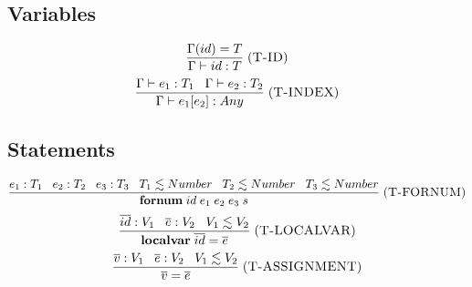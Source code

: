 \documentclass[12pt]{article}
\newcommand{\mylabel}[1]{\; (\textsc{#1})}
\newcommand{\env}{\Gamma}
\begin{document}
\subsection{Variables}

\[
\frac{\env(id) = T}
     {\env \vdash id : T}
\mylabel{T-ID}
\]
\[
\frac{\env \vdash e_{1}:T_{1} \;\;\; \env \vdash e_{2}:T_{2}}
     {\env \vdash e_{1}[e_{2}] : Any}
\mylabel{T-INDEX}
\]

\subsection{Statements}

\[
\frac{e_{1}:T_{1} \;\;\; e_{2}:T_{2} \;\;\; e_{3}:T_{3} \;\;\;
      T_{1} \lesssim Number \;\;\; T_{2} \lesssim Number \;\;\;
      T_{3} \lesssim Number}
     {\textbf{fornum} \; id \; e_{1} \; e_{2} \; e_{3} \; s}
\mylabel{T-FORNUM}
\]
\[
\frac{\overline{id}:V_{1} \;\;\; \overline{e}:V_2 \;\;\; V_{1} \lesssim V_{2}}
     {\textbf{localvar} \; \overline{id} = \overline{e}}
\mylabel{T-LOCALVAR}
\]
\[
\frac{\overline{v}:V_{1} \;\;\; \overline{e}:V_2 \;\;\; V_{1} \lesssim V_{2}}
     {\overline{v} = \overline{e}}
\mylabel{T-ASSIGNMENT}
\]
\end{document}
